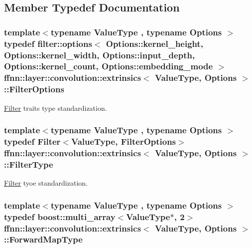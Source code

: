 \subsection{Member Typedef Documentation}
\hypertarget{structffnn_1_1layer_1_1convolution_1_1extrinsics_a0de5368aa5d42881cfd7406cc2762bc5}{
\subsubsection[{Filter\-Options}]{\setlength{\rightskip}{0pt plus 5cm}template$<$typename Value\-Type , typename Options $>$ typedef {\bf filter\-::options}$<$ Options\-::kernel\-\_\-height, Options\-::kernel\-\_\-width, Options\-::input\-\_\-depth, Options\-::kernel\-\_\-count, Options\-::embedding\-\_\-mode $>$ {\bf ffnn\-::layer\-::convolution\-::extrinsics}$<$ Value\-Type, Options $>$\-::{\bf Filter\-Options}}}\label{structffnn_1_1layer_1_1convolution_1_1extrinsics_a0de5368aa5d42881cfd7406cc2762bc5}


\hyperlink{structffnn_1_1layer_1_1convolution_1_1_filter}{Filter} traits type standardization. 

\hypertarget{structffnn_1_1layer_1_1convolution_1_1extrinsics_a3e02025b65ed127949b68053776507c8}{
\subsubsection[{Filter\-Type}]{\setlength{\rightskip}{0pt plus 5cm}template$<$typename Value\-Type , typename Options $>$ typedef {\bf Filter}$<$Value\-Type, {\bf Filter\-Options}$>$ {\bf ffnn\-::layer\-::convolution\-::extrinsics}$<$ Value\-Type, Options $>$\-::{\bf Filter\-Type}}}\label{structffnn_1_1layer_1_1convolution_1_1extrinsics_a3e02025b65ed127949b68053776507c8}


\hyperlink{structffnn_1_1layer_1_1convolution_1_1_filter}{Filter} tyoe standardization. 

\hypertarget{structffnn_1_1layer_1_1convolution_1_1extrinsics_abda7b16eb793b1b130063d51ef701296}{
\subsubsection[{Forward\-Map\-Type}]{\setlength{\rightskip}{0pt plus 5cm}template$<$typename Value\-Type , typename Options $>$ typedef boost\-::multi\-\_\-array$<$Value\-Type$\ast$, 2$>$ {\bf ffnn\-::layer\-::convolution\-::extrinsics}$<$ Value\-Type, Options $>$\-::{\bf Forward\-Map\-Type}}}\label{structffnn_1_1layer_1_1convolution_1_1extrinsics_abda7b16eb793b1b130063d51ef701296}


